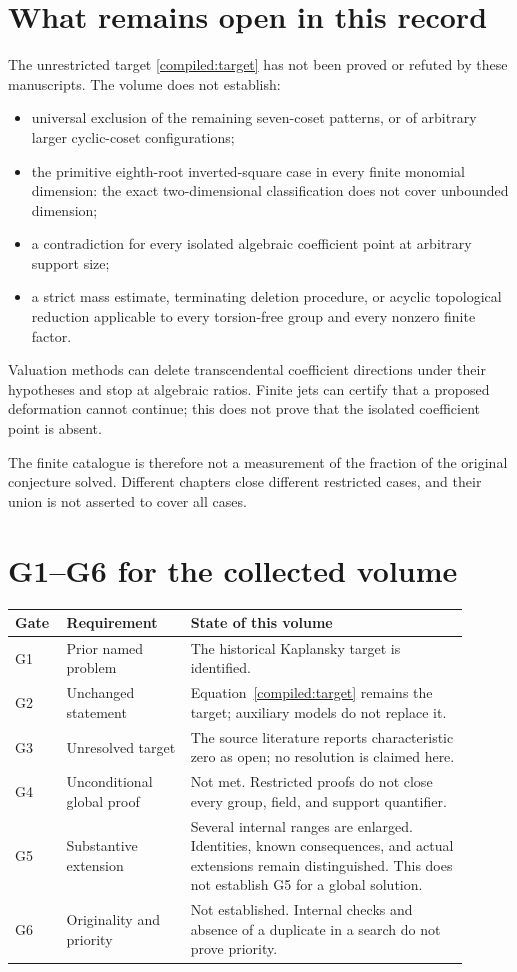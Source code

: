 \documentclass[11pt,a4paper,oneside]{report}
\theoremstyle{definition}
\theoremstyle{remark}
\begin{document}
\section{What remains open in this record}
The unrestricted target \eqref{compiled:target} has not been
proved or refuted by these manuscripts. The volume does not establish:
\begin{itemize}
\item universal exclusion of the remaining seven-coset patterns,
or of arbitrary larger cyclic-coset configurations;
\item the primitive eighth-root inverted-square case in every
finite monomial dimension: the exact two-dimensional
classification does not cover unbounded dimension;
\item a contradiction for every isolated algebraic coefficient
point at arbitrary support size;
\item a strict mass estimate, terminating deletion procedure,
or acyclic topological reduction applicable to every
torsion-free group and every nonzero finite factor.
\end{itemize}
Valuation methods can delete transcendental coefficient directions
under their hypotheses and stop at algebraic ratios. Finite jets
can certify that a proposed deformation cannot continue; this
does not prove that the isolated coefficient point is absent.

The finite catalogue is therefore not a measurement of the fraction
of the original conjecture solved. Different chapters close
different restricted cases, and their union is not asserted
to cover all cases.

\section{G1--G6 for the collected volume}
\begin{longtable}{P{0.08\linewidth}P{0.25\linewidth}P{0.57\linewidth}}
\toprule Gate & Requirement & State of this volume\\
\midrule\endhead
G1 & Prior named problem & The historical Kaplansky target is identified.\\
G2 & Unchanged statement & Equation~\eqref{compiled:target} remains the target; auxiliary models do not replace it.\\
G3 & Unresolved target & The source literature reports characteristic zero as open; no resolution is claimed here.\\
G4 & Unconditional global proof & Not met. Restricted proofs do not close every group, field, and support quantifier.\\
G5 & Substantive extension & Several internal ranges are enlarged. Identities, known consequences, and actual extensions remain distinguished. This does not establish G5 for a global solution.\\
G6 & Originality and priority & Not established. Internal checks and absence of a duplicate in a search do not prove priority.\\
\bottomrule
\end{longtable}
\end{document}
